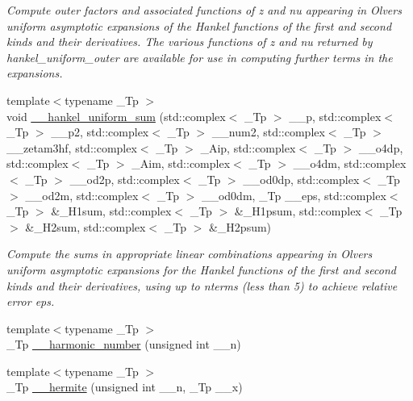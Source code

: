 \begin{DoxyCompactItemize}
\begin{DoxyCompactList}\small\item\em Compute outer factors and associated functions of {\ttfamily z} and {\ttfamily nu} appearing in Olver\textquotesingle{}s uniform asymptotic expansions of the Hankel functions of the first and second kinds and their derivatives. The various functions of z and nu returned by {\ttfamily hankel\+\_\+uniform\+\_\+outer} are available for use in computing further terms in the expansions. \end{DoxyCompactList}\item 
{\footnotesize template$<$typename \+\_\+\+Tp $>$ }\\void \hyperlink{namespacestd_1_1____detail_a561dc02bc44b2dba376d6047289563c7}{\+\_\+\+\_\+hankel\+\_\+uniform\+\_\+sum} (std\+::complex$<$ \+\_\+\+Tp $>$ \+\_\+\+\_\+p, std\+::complex$<$ \+\_\+\+Tp $>$ \+\_\+\+\_\+p2, std\+::complex$<$ \+\_\+\+Tp $>$ \+\_\+\+\_\+num2, std\+::complex$<$ \+\_\+\+Tp $>$ \+\_\+\+\_\+zetam3hf, std\+::complex$<$ \+\_\+\+Tp $>$ \+\_\+\+Aip, std\+::complex$<$ \+\_\+\+Tp $>$ \+\_\+\+\_\+o4dp, std\+::complex$<$ \+\_\+\+Tp $>$ \+\_\+\+Aim, std\+::complex$<$ \+\_\+\+Tp $>$ \+\_\+\+\_\+o4dm, std\+::complex$<$ \+\_\+\+Tp $>$ \+\_\+\+\_\+od2p, std\+::complex$<$ \+\_\+\+Tp $>$ \+\_\+\+\_\+od0dp, std\+::complex$<$ \+\_\+\+Tp $>$ \+\_\+\+\_\+od2m, std\+::complex$<$ \+\_\+\+Tp $>$ \+\_\+\+\_\+od0dm, \+\_\+\+Tp \+\_\+\+\_\+eps, std\+::complex$<$ \+\_\+\+Tp $>$ \&\+\_\+\+H1sum, std\+::complex$<$ \+\_\+\+Tp $>$ \&\+\_\+\+H1psum, std\+::complex$<$ \+\_\+\+Tp $>$ \&\+\_\+\+H2sum, std\+::complex$<$ \+\_\+\+Tp $>$ \&\+\_\+\+H2psum)
\begin{DoxyCompactList}\small\item\em Compute the sums in appropriate linear combinations appearing in Olver\textquotesingle{}s uniform asymptotic expansions for the Hankel functions of the first and second kinds and their derivatives, using up to nterms (less than 5) to achieve relative error {\ttfamily eps}. \end{DoxyCompactList}\item 
{\footnotesize template$<$typename \+\_\+\+Tp $>$ }\\\+\_\+\+Tp \hyperlink{namespacestd_1_1____detail_aeab2857a72e09b180a765bf435f72c2e}{\+\_\+\+\_\+harmonic\+\_\+number} (unsigned int \+\_\+\+\_\+n)
\item 
{\footnotesize template$<$typename \+\_\+\+Tp $>$ }\\\+\_\+\+Tp \hyperlink{namespacestd_1_1____detail_aeb57881dd224320629e184c9118c910b}{\+\_\+\+\_\+hermite} (unsigned int \+\_\+\+\_\+n, \+\_\+\+Tp \+\_\+\+\_\+x)

\end{DoxyCompactItemize}

